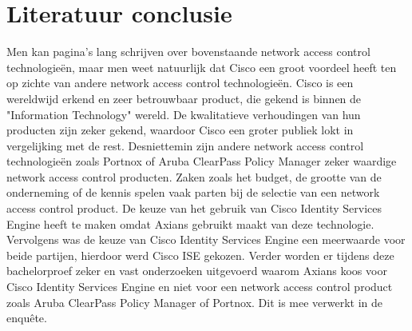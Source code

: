 \section{Literatuur conclusie}
Men kan pagina’s lang schrijven over bovenstaande network access control technologieën, maar men weet natuurlijk dat Cisco een groot voordeel heeft ten op zichte van andere network access control technologieën. Cisco is een wereldwijd erkend en zeer betrouwbaar product, die gekend is binnen de "Information Technology" wereld. De kwalitatieve verhoudingen van hun producten zijn zeker gekend, waardoor Cisco een groter publiek lokt in vergelijking met de rest.
\newline
\newline
Desniettemin zijn andere network access control technologieën zoals Portnox of Aruba ClearPass Policy Manager zeker waardige network access control producten. Zaken zoals het budget, de grootte van de onderneming of de kennis spelen vaak parten bij de selectie van een network access control product. 
\newline
\newline
De keuze van het gebruik van Cisco Identity Services Engine heeft te maken omdat Axians gebruikt maakt van deze technologie. Vervolgens was de keuze van Cisco Identity Services Engine een meerwaarde voor beide partijen, hierdoor werd Cisco ISE gekozen. Verder worden er tijdens deze bachelorproef zeker en vast onderzoeken uitgevoerd waarom Axians koos voor Cisco Identity Services Engine en niet voor een network access control product zoals Aruba ClearPass Policy Manager of Portnox. Dit is mee verwerkt in de enquête.

